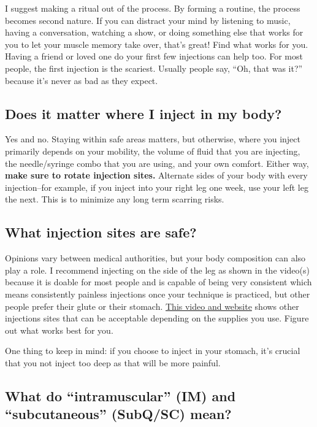 \documentclass{article}
\begin{document}
I suggest making a ritual out of the process. By forming a routine, the process becomes second nature. If you can distract your mind by listening to music, having a conversation, watching a show, or doing something else that works for you to let your muscle memory take over, that’s great! Find what works for you. Having a friend or loved one do your first few injections can help too. For most people, the first injection is the scariest. Usually people say, “Oh, that was it?” because it’s never as bad as they expect.

\subsection{Does it matter where I inject in my body?}

Yes and no. Staying within safe areas matters, but otherwise, where you inject primarily depends on your mobility, the volume of fluid that you are injecting, the needle/syringe combo that you are using, and your own comfort. Either way, \textbf{make sure to rotate injection sites.} Alternate sides of your body with every injection–for example, if you inject into your right leg one week, use your left leg the next. This is to minimize any long term scarring risks.

\subsection{What injection sites are safe?}\label{5-5}

Opinions vary between medical authorities, but your body composition can also play a role. I recommend injecting on the side of the leg as shown in the video(s) because it is doable for most people and is capable of being very consistent which means consistently painless injections once your technique is practiced, but other people prefer their glute or their stomach. \href{https://vertisis.com/articles/how-to-self-administer-a-subcutaneous-injection}{This video and website} shows other injections sites that can be acceptable depending on the supplies you use. Figure out what works best for you.

One thing to keep in mind: if you choose to inject in your stomach, it's crucial that you not inject too deep as that will be more painful.

\subsection{What do “intramuscular” (IM) and “subcutaneous” (SubQ/SC) mean?}
\end{document}
